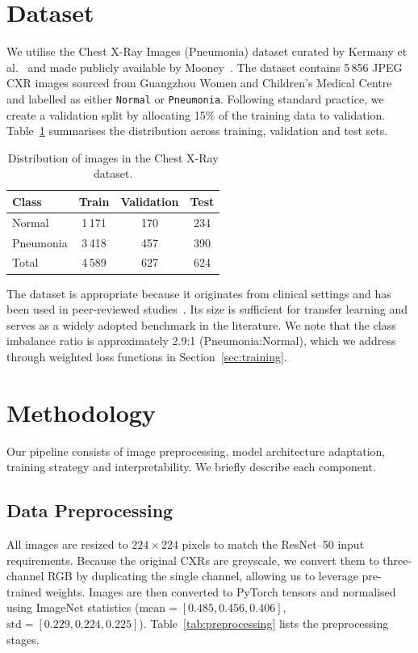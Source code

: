 \documentclass[sigconf]{acmart}
\begin{document}
\section{Dataset}
We utilise the Chest X-Ray Images (Pneumonia) dataset curated by Kermany et al.~\cite{Kermany2018} and made publicly available by Mooney~\cite{Mooney2018}. The dataset contains 5\,856 JPEG CXR images sourced from Guangzhou Women and Children's Medical Centre and labelled as either \texttt{Normal} or \texttt{Pneumonia}. Following standard practice, we create a validation split by allocating 15\% of the training data to validation. Table~\ref{tab:dataset} summarises the distribution across training, validation and test sets.

\begin{table}[t]
  \caption{Distribution of images in the Chest X-Ray dataset.}
  \label{tab:dataset}
  \begin{tabular}{lccc}
    \toprule
    Class      & Train & Validation & Test \\
    \midrule
    Normal     & 1\,171 & 170 & 234 \\
    Pneumonia  & 3\,418 & 457 & 390 \\
    \midrule
    Total      & 4\,589 & 627 & 624 \\
    \bottomrule
  \end{tabular}
\end{table}

The dataset is appropriate because it originates from clinical settings and has been used in peer-reviewed studies~\cite{Kermany2018}. Its size is sufficient for transfer learning and serves as a widely adopted benchmark in the literature. We note that the class imbalance ratio is approximately 2.9:1 (Pneumonia:Normal), which we address through weighted loss functions in Section~\ref{sec:training}.

\section{Methodology}
Our pipeline consists of image preprocessing, model architecture adaptation, training strategy and interpretability. We briefly describe each component.

\subsection{Data Preprocessing}
All images are resized to $224 \times 224$ pixels to match the ResNet--50 input requirements. Because the original CXRs are greyscale, we convert them to three-channel RGB by duplicating the single channel, allowing us to leverage pre-trained weights. Images are then converted to PyTorch tensors and normalised using ImageNet statistics ($\text{mean} = [0.485, 0.456, 0.406]$, $\text{std} = [0.229, 0.224, 0.225]$). Table~\ref{tab:preprocessing} lists the preprocessing stages.
\end{document}
